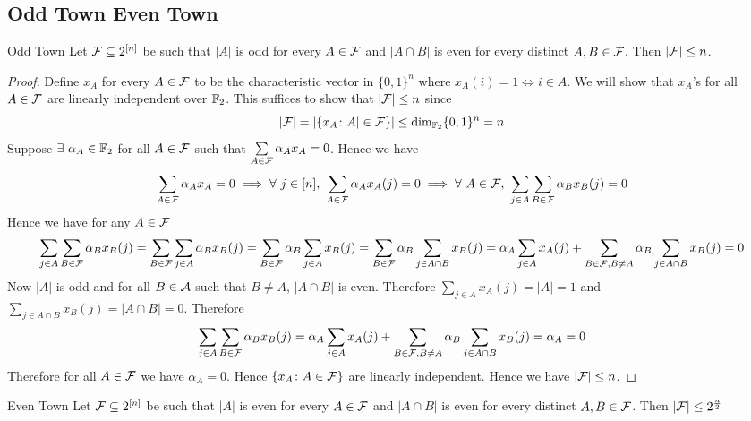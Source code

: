 \documentclass[twoside]{article}
\begin{document}
\subsection{Odd Town Even Town}
\begin{lemma}{Odd Town}{}
	Let $\mathcal{F}\subseteq 2^{[n]}$ be such that $|A|$ is odd for every $A\in \mathcal{F}$ and $|A\cap B|$ is even for every distinct $A,B\in \mathcal{F}$. Then $|\mathcal{F}|\leq n$.
\end{lemma}
\begin{proof}
	Define $x_A$ for every $A\in \mathcal{F}$ to be the characteristic vector in $\{0,1\}^n$ where $x_A(i)=1\iff i\in A$. We will show that $x_A$'s for all $A\in\mathcal{F}$ are linearly independent over $\mathbb{F}_2$. This suffices to show that $|\mathcal{F}|\leq n$ since $$|\mathcal{F}|=|\{x_A\colon A|\in\mathcal{F}\}|\leq \dim_{\mathbb{F}_2} \{0,1\}^n=n$$Suppose $\exists\ \alpha_A\in\mathbb{F}_2$ for all $A\in \mathcal{F}$ such that $\sum\limits_{A\in \mathcal{F}}\alpha_Ax_A=0$. Hence we have$$
	\sum_{A\in \mcF}\alpha_Ax_A=0  \implies \forall\ j\in[n],\ \sum_{A\in \mcF}\alpha_Ax_{A}(j)=0          \implies \forall \ A\in\mcF,\ \sum_{j\in A}\sum_{B\in\mcF}\alpha_Bx_B(j)=0 $$Hence we have for any $A\in\mathcal{F}$ $$
	\sum_{j\in A}\sum_{B\in\mathcal{F}}\alpha_Bx_B(j)= \sum_{B\in\mathcal{F}}\sum_{j\in A}\alpha_Bx_B(j)=\sum_{B\in\mathcal{F}}\alpha_B\sum_{j\in A}x_B(j)=\sum_{B\in\mathcal{F}}\alpha_B\sum_{j\in A\cap B}x_B(j)=\alpha_A\sum_{j\in A}x_A(j)+\sum_{B\in\mathcal{F}, B\neq A}\alpha_B\sum_{j\in A\cap B}x_B(j) =0 $$Now $|A|$ is odd and for all $B\in\mathcal{A}$ such that $B\neq A$, $|A\cap B|$ is even. Therefore $\sum\limits_{j\in A}x_A(j)=|A|=1$ and $\sum\limits_{j\in A\cap B}x_B(j)=|A\cap B|=0$. Therefore $$\sum_{j\in A}\sum_{B\in\mathcal{F}}\alpha_Bx_B(j)=\alpha_A\sum_{j\in A}x_A(j)+\sum_{B\in\mathcal{F}, B\neq A}\alpha_B\sum_{j\in A\cap B}x_B(j) =\alpha_A=0$$Therefore for all $A\in\mathcal{F}$ we have $\alpha_A=0$. Hence $\{x_A\colon A\in\mathcal{F}\}$ are linearly independent. Hence we have $|\mathcal{F}|\leq n$. 
\end{proof}
\begin{lemma}{Even Town}{}
	Let $\mathcal{F}\subseteq 2^{[n]}$ be such that $|A|$ is even for every $A\in \mathcal{F}$ and $|A\cap B|$ is even for every distinct $A,B\in \mathcal{F}$. Then $|\mathcal{F}|\leq 2^{\frac{n}2}$
\end{lemma}
\end{document}
